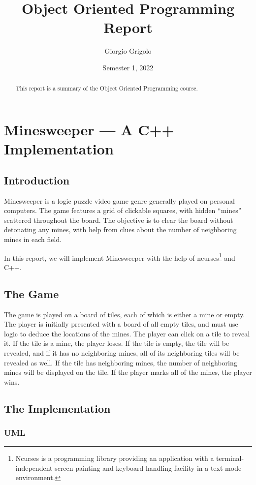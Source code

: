 \documentclass{article}
\title{Object Oriented Programming Report}
\author{Giorgio Grigolo}
\date{Semester 1, 2022}
\begin{document}
\maketitle
\begin{abstract}
This report is a summary of the Object Oriented Programming course.
\end{abstract}


\newpage

\section{Minesweeper --- A C++ Implementation}

\subsection{Introduction}
Minesweeper is a logic puzzle video game genre generally played on personal
computers. The game features a grid of clickable squares, with hidden ``mines''
scattered throughout the board. The objective is to clear the board without
detonating any mines, with help from clues about the number of neighboring
mines in each field.

In this report, we will implement Minesweeper with the help of
ncurses\footnote{Ncurses is a programming library providing an application with a 
terminal-independent screen-painting and keyboard-handling facility in a
text-mode environment.} and C++.

\subsection{The Game}
The game is played on a board of tiles, each of which is either a mine or
empty. The player is initially presented with a board of all empty tiles, and
must use logic to deduce the locations of the mines. The player can click on a
tile to reveal it. If the tile is a mine, the player loses. If the tile is
empty, the tile will be revealed, and if it has no neighboring mines, all of
its neighboring tiles will be revealed as well. If the tile has neighboring
mines, the number of neighboring mines will be displayed on the tile. If the player
marks all of the mines, the player wins.


\subsection{The Implementation}

\subsubsection{UML}
\end{document}
